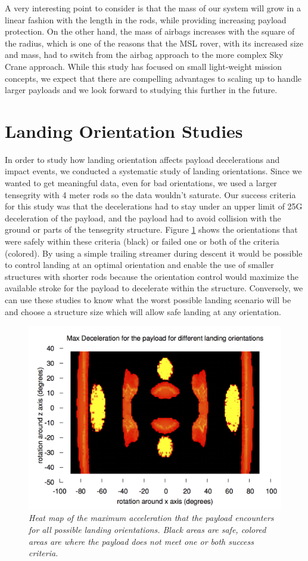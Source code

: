 A very interesting point to consider is that the mass of our system will grow in a linear fashion with the length in the rods, while providing increasing payload protection.  On the other hand, the mass of airbags increases with the square of the radius, which is one of the reasons that the MSL rover, with its increased size and mass, had to switch from the airbag approach to the more complex Sky Crane approach.  While this study has focused on small light-weight mission concepts, we expect that there are compelling advantages to scaling up to handle larger payloads and we look forward to studying this further in the future.

\section{Landing Orientation Studies}
In order to study how landing orientation affects payload decelerations and impact events, we conducted a systematic study of landing orientations.  Since we wanted to get meaningful data, even for bad orientations, we used a larger tensegrity with 4 meter rods so the data wouldn't saturate.  Our success criteria for this study was that the decelerations had to stay under an upper limit of 25G deceleration of the payload, and the payload had to avoid collision with the ground or parts of the tensegrity structure.  Figure \ref{fig:landingHeatMapRot} shows the orientations that were safely within these criteria (black) or failed one or both of the criteria (colored).  By using a simple trailing streamer during descent it would be possible to control landing at an optimal orientation and enable the use of smaller structures with shorter rods because the orientation control would maximize the available stroke for the payload to decelerate within the structure.  Conversely, we can use these studies to know what the worst possible landing scenario will be and choose a structure size which will allow safe landing at any orientation.

\begin{figure}[htbp]
   \centering
   \includegraphics[width=0.8\columnwidth]{tex/images/landing/landingHeatMapRot.png}
   \caption{\em Heat map of the maximum acceleration that the payload encounters for all possible landing orientations. Black areas are safe, colored areas are where the payload does not meet one or both success criteria.}
   \label{fig:landingHeatMapRot}
\end{figure}


